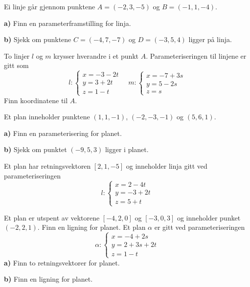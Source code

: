



	
\opgt
\setcounter{section}{1}	
Ei linje går gjennom punktene $ A=(-2, 3, -5) $ og $ B=(-1, 1, -4) $.\os

\textbf{a)}	Finn en parameterframstilling for linja.\os

\textbf{b)} Sjekk om punktene $ C=(-4, 7, -7) $ og $ D=(-3, 5, 4) $ ligger på linja.

To linjer $ l $ og $ m $ krysser hverandre i et punkt $ A $. Parameteriseringen til linjene er gitt som
\[l: \left\lbrace{
	\begin{array}{l}
	x=-3-2t  \\
	y= 3+ 2t   \\
	z= 1-t 
	\end{array}
}\right. \quad 
m: \left\lbrace{
	\begin{array}{l}
	x=-7 +3s  \\
	y= 5- 2s   \\
	z= s 
	\end{array}
}\right. \]
Finn koordinatene til $ A $.

Et plan inneholder punktene $ (1, 1,-1) $, $ (-2, -3, -1) $ og $ (5, 6, 1) $. \os

\textbf{a)} Finn en parameterisering for planet.\os

\textbf{b)} Sjekk om punktet $ (-9, 5, 3) $ ligger i planet.


Et plan har retningsvektoren $ [2, 1, -5] $ og inneholder linja gitt ved parameteriseringen
\[ l: \left\lbrace{
	\begin{array}{l}
	x=2-4t  \\
	y= -3+ 2t   \\
	z= 5+t 
	\end{array}
}\right. \]


\nes
{}
Et plan er utspent av vektorene $ [-4, 2, 0] $ og $ [-3, 0, 3] $ og inneholder punket $ (-2, 2, 1) $. Finn en ligning for planet.
\newpage
{}
Et plan $ \alpha $ er gitt ved parameteriseringen
\[\alpha: \left\lbrace{
	\begin{array}{l}
	x=-4 + 2s  \\
	y= 2+ 3s + 2t   \\
	z= 1-t 
	\end{array}
}\right. \]
\textbf{a)} Finn to retningsvektorer for planet.\os

\textbf{b)} Finn en ligning for planet.

